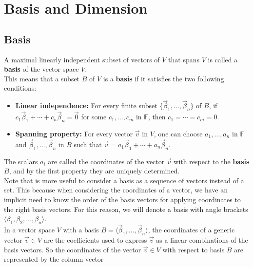 \section{Basis and Dimension}

\subsection{Basis}

A maximal linearly independent subset of vectors of $V$ that spans $V$ is called a \textbf{basis} of the vector space $V$.
\\

This means that a subset $B$ of $V$ is a \textbf{basis} if it satisfies the two following conditions:

\begin{itemize}
\item \textbf{Linear independence:}
    For every finite subset $\{ \vec{\beta} _{1},\dotsc ,\vec {\beta}_{n}\}$ of $B$, if ${\displaystyle c_{1}\vec {\beta}_{1} + \cdots + c_{n}\vec {\beta}_{n}=\vec {0} }$ for some ${\displaystyle c_{1},\dotsc ,c_{m}}$ in $\mathbb F$, then ${\displaystyle c_{1}=\cdots =c_{m}=0}$.
\item \textbf{Spanning property:}
    For every vector $\vec{v}$ in $V$, one can choose ${\displaystyle a_{1},\dots, a_{n}}$ in $\mathbb F$ and ${\displaystyle \vec {\beta}_{1},\dots  ,\vec {\beta}_{n}}$ in $B$ such that ${\displaystyle \vec {v} = a_{1}\vec {\beta}_{1} + \cdots + a_{n}\vec {\beta}_{n}}$.
\end{itemize}

The scalars $a_{i}$ are called the coordinates of the vector $\vec{v}$ with respect to the \textbf{basis} $B$, and by the first property they are uniquely determined.
\\

Note that is more useful to consider a basis as a sequence of vectors instead of a set. This because when considering the coordinates of a vector, we have an implicit need to know the order of the basis vectors for applying coordinates to the right basis vectors. For this reason, we will denote a basis with angle brackets $\langle \beta_1, \beta_2, \dots, \beta_n \rangle$.
\\

In a vector space $V$ with a basis $B = \langle\vec \beta_1, \dots, \vec \beta_n \rangle$, the coordinates of a generic vector $\vec v \in V$ are the coefficients used to express $\vec v$ as a linear combinations of the basis vectors. So the coordinates of the vector $\vec v \in V$ with respect to basis $B$ are represented by the column vector 

